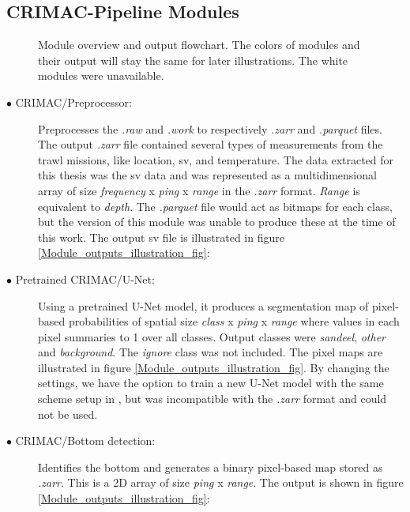             \subsection{CRIMAC-Pipeline Modules} \label{CRIMAC-pipeline}
              \begin{figure}[H]
                \centering
                
                \caption[Module overview]{Module overview and output flowchart. The colors of modules and  their output will stay the same for later illustrations. The white modules were unavailable.}
              	\medskip 
                \label{Module_overview_fig}
            \end{figure}

            \begin{description}
              \item[$\bullet$ CRIMAC/Preprocessor:] Preprocesses the \textit{.raw} and \textit{.work} to respectively \textit{.zarr} and \textit{.parquet} files. The output \textit{.zarr} file contained several types of measurements from the trawl missions, like location, \gls{sv}, and temperature. The data extracted for this thesis was the \gls{sv} data and was represented as a multidimensional array of size \textit{frequency} x \textit{ping} x \textit{range} in the  \textit{.zarr} format. \textit{Range} is equivalent to \textit{depth}. The \textit{.parquet} file would act as bitmaps for each class, but the version of this module was unable to produce these at the time of this work. The output \gls{sv} file is illustrated in figure \ref{Module_outputs_illustration_fig}:

              \item[$\bullet$ Pretrained CRIMAC/U-Net:] Using a pretrained U-Net model, it produces a segmentation map of pixel-based probabilities of spatial size \textit{class} x \textit{ping} x \textit{range} where values in each pixel summaries to 1 over all classes. Output classes were \textit{sandeel}, \textit{other} and \textit{background}. The \textit{ignore} class was not included. The pixel maps are illustrated in figure \ref{Module_outputs_illustration_fig}.  By changing the settings, we have the option to train a new U-Net model with the same scheme setup in \citeauthor{brautaset2020acoustic}, but was incompatible with the \textit{.zarr} format and could not be used.
              
              \item[$\bullet$ CRIMAC/Bottom detection:] Identifies the bottom and generates a binary pixel-based map stored as \textit{.zarr}. This is a 2D array of size \textit{ping} x \textit{range}. The output is shown in figure \ref{Module_outputs_illustration_fig}:

            \end{description}
            
